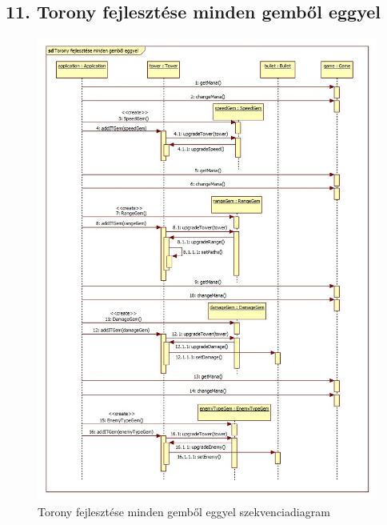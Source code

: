 \subsection{11. Torony fejlesztése minden gemből eggyel}
\begin{figure}[H]
\begin{center}
\includegraphics[width=17cm]{chapters/chapter05/images/sd_Torony_fejlesztese_minden_gembol_eggyel.jpg}
\caption{Torony fejlesztése minden gemből eggyel szekvenciadiagram}
\label{fig:sd_Torony_fejlesztese_minden_gembol_eggyel}
\end{center}
\end{figure}

